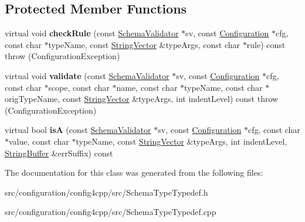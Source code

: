 \subsection*{Protected Member Functions}
\begin{DoxyCompactItemize}
\item 
\hypertarget{classCONFIG4CPP__NAMESPACE_1_1SchemaTypeTypedef_af819a0c511863abdb7b92f740c6d1a3c}{virtual void {\bfseries check\-Rule} (const \hyperlink{classCONFIG4CPP__NAMESPACE_1_1SchemaValidator}{Schema\-Validator} $\ast$sv, const \hyperlink{classCONFIG4CPP__NAMESPACE_1_1Configuration}{Configuration} $\ast$cfg, const char $\ast$type\-Name, const \hyperlink{classCONFIG4CPP__NAMESPACE_1_1StringVector}{String\-Vector} \&type\-Args, const char $\ast$rule) const   throw (\-Configuration\-Exception)}\label{classCONFIG4CPP__NAMESPACE_1_1SchemaTypeTypedef_af819a0c511863abdb7b92f740c6d1a3c}

\item 
\hypertarget{classCONFIG4CPP__NAMESPACE_1_1SchemaTypeTypedef_ac4b0d3539b601e4a6189c1267566cd89}{virtual void {\bfseries validate} (const \hyperlink{classCONFIG4CPP__NAMESPACE_1_1SchemaValidator}{Schema\-Validator} $\ast$sv, const \hyperlink{classCONFIG4CPP__NAMESPACE_1_1Configuration}{Configuration} $\ast$cfg, const char $\ast$scope, const char $\ast$name, const char $\ast$type\-Name, const char $\ast$orig\-Type\-Name, const \hyperlink{classCONFIG4CPP__NAMESPACE_1_1StringVector}{String\-Vector} \&type\-Args, int indent\-Level) const   throw (\-Configuration\-Exception)}\label{classCONFIG4CPP__NAMESPACE_1_1SchemaTypeTypedef_ac4b0d3539b601e4a6189c1267566cd89}

\item 
\hypertarget{classCONFIG4CPP__NAMESPACE_1_1SchemaTypeTypedef_a04495ad9037113c17c3add379e4048a0}{virtual bool {\bfseries is\-A} (const \hyperlink{classCONFIG4CPP__NAMESPACE_1_1SchemaValidator}{Schema\-Validator} $\ast$sv, const \hyperlink{classCONFIG4CPP__NAMESPACE_1_1Configuration}{Configuration} $\ast$cfg, const char $\ast$value, const char $\ast$type\-Name, const \hyperlink{classCONFIG4CPP__NAMESPACE_1_1StringVector}{String\-Vector} \&type\-Args, int indent\-Level, \hyperlink{classCONFIG4CPP__NAMESPACE_1_1StringBuffer}{String\-Buffer} \&err\-Suffix) const }\label{classCONFIG4CPP__NAMESPACE_1_1SchemaTypeTypedef_a04495ad9037113c17c3add379e4048a0}

\end{DoxyCompactItemize}


The documentation for this class was generated from the following files\-:\begin{DoxyCompactItemize}
\item 
src/configuration/config4cpp/src/Schema\-Type\-Typedef.\-h\item 
src/configuration/config4cpp/src/Schema\-Type\-Typedef.\-cpp\end{DoxyCompactItemize}
